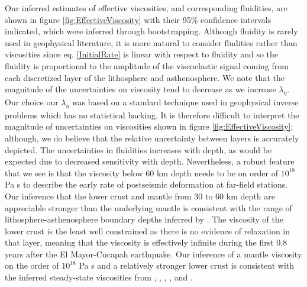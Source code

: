 \documentclass[1p]{elsarticle}
\begin{document}
Our inferred estimates of effective viscosities, and corresponding fluidities, are shown in figure \ref{fig:EffectiveViscosity} with their 95\% confidence intervals indicated, which were inferred through bootstrapping. Although fluidity is rarely used in geophysical literature, it is more natural to consider fludities rather than viscosities since eq. \ref{InitialRate} is linear with respect to fluidity and so the fluidity is proportional to the amplitude of the viscoelastic signal coming from each discretized layer of the lithosphere and asthenosphere.  We note that the magnitude of the uncertainties on viscosity tend to decrease as we increase $\lambda_\eta$. Our choice our $\lambda_\eta$ was based on a standard technique used in geophysical inverse problems which has no statistical backing.  It is therefore difficult to interpret the magnitude of uncertainties on viscosities shown in figure \ref{fig:EffectiveViscosity}; although, we do believe that the relative uncertainty between layers is accurately depicted.  The uncertainties in fluidities increases with depth, as would be expected due to decreased sensitivity with depth.  Nevertheless, a robust feature that we see is that the viscosity below 60 km depth needs to be on order of $10^{18}$ Pa s to describe the early rate of postseismic deformation at far-field stations.  Our inference that the lower crust and mantle from 30 to 60 km depth are appreciable stronger than the underlying mantle is consistent with the range of lithosphere-asthenosphere boundary depths inferred by \citet{Lekic2011}.  The viscosity of the lower crust is the least well constrained as there is no evidence of relaxation in that layer, meaning that the viscosity is effectively infinite during the first 0.8 years after the El Mayor-Cucapah earthquake. Our inference of a mantle viscosity on the order of $10^{18}$ Pa s and a relatively stronger lower crust is consistent with the inferred steady-state viscosities from \citet{Pollitz2000}, \citet{Pollitz2003}, \citet{Johnson2007}, \citet{Spinler2015}, and \citet{Rollins2015}.  
\end{document}
